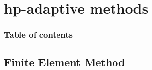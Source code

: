 \section{hp-adaptive methods}





\begin{frame}
\frametitle{Table of contents}

\tableofcontents[currentsection]
\end{frame}





\subsection{Finite Element Method}





